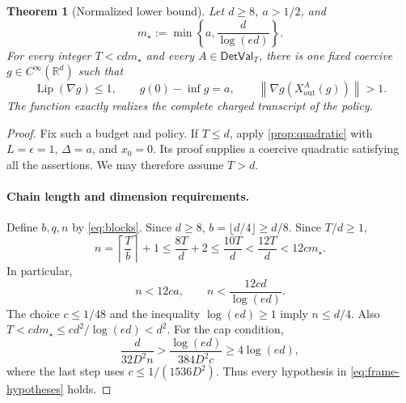 \documentclass[11pt]{article}
\numberwithin{equation}{section}
\newtheorem{theorem}{Theorem}[section]
\theoremstyle{definition}
\theoremstyle{remark}
\newcommand{\R}{\mathbb{R}}
\newcommand{\norm}[1]{\left\lVert #1\right\rVert}
\newcommand{\DetVal}{\mathsf{DetVal}}
\newcommand{\Lip}{\operatorname{Lip}}
\begin{document}
\begin{theorem}[Normalized lower bound]
\label{thm:normalized}
Let $d\geq8$, $a>1/2$, and
\begin{equation}
    m_\star:=\min\left\{a,\frac{d}{\log(ed)}\right\}.
    \label{eq:mstar}
\end{equation}
For every integer $T<cdm_\star$ and every $A\in\DetVal_T$, there is one
fixed coercive $g\in C^\infty(\R^d)$ such that
\begin{equation}
    \Lip(\nabla g)\leq1,\qquad g(0)-\inf g=a,\qquad
    \norm{\nabla g(X_{\mathrm{out}}^A(g))}>1.
    \label{eq:normalized-result}
\end{equation}
The function exactly realizes the complete charged transcript of the
policy.
\end{theorem}

\begin{proof}
Fix such a budget and policy. If $T\leq d$, apply \cref{prop:quadratic} with
$L=\epsilon=1$, $\Delta=a$, and $x_0=0$. Its proof supplies a coercive
quadratic satisfying all the assertions. We may therefore assume $T>d$.

\paragraph{Chain length and dimension requirements.}
Define $b,q,n$ by \eqref{eq:blocks}. Since $d\geq8$,
$b=\lfloor d/4\rfloor\geq d/8$. Since $T/d\geq1$,
\begin{equation}
    n=\left\lceil\frac Tb\right\rceil+1
      \leq\frac{8T}{d}+2
      \leq\frac{10T}{d}
      <\frac{12T}{d}
      <12c m_\star.
    \label{eq:length}
\end{equation}
In particular,
\begin{equation}
    n<12ca,\qquad n<\frac{12cd}{\log(ed)}.
    \label{eq:length-both}
\end{equation}
The choice $c\leq1/48$ and the inequality $\log(ed)\geq1$ imply
$n\leq d/4$. Also
$T<cdm_\star\leq cd^2/\log(ed)<d^2$.
For the cap condition,
\begin{equation}
    \frac{d}{32D^2n}
       >\frac{\log(ed)}{384D^2c}\geq4\log(ed),
    \label{eq:cap-accounting}
\end{equation}
where the last step uses $c\leq1/(1536D^2)$.
Thus every hypothesis in \eqref{eq:frame-hypotheses} holds.


\end{proof}
\end{document}
